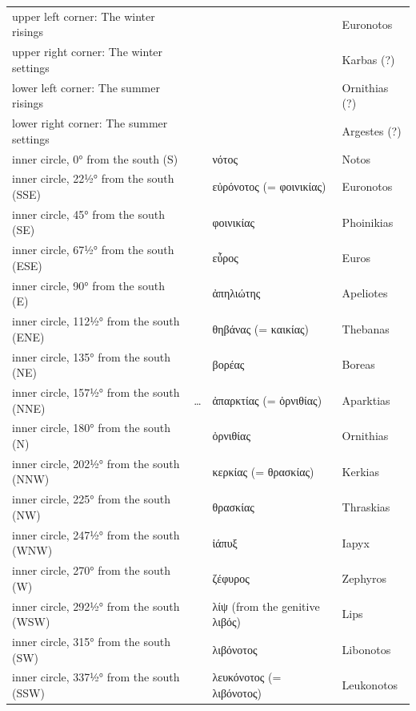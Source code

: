 \begin{landscape}
{\begin{longtable}{L{62mm}L{30mm}L{60mm}L{35mm}}
upper left corner: The winter risings &  &  & Euronotos\\
upper right corner: The winter settings &  &  & Karbas (?)\\
lower left corner: The summer risings &  &  & Ornithias (?)\\
lower right corner: The summer settings &  &  & Argestes (?)\\
inner circle, 0° from the south (S) &  &  νότος & Notos\\
inner circle, 22½° from the south (SSE) &  &  εὐρόνοτος (= φοινικίας) & Euronotos\\
inner circle, 45° from the south (SE) &  &  φοινικίας & Phoinikias\\
inner circle, 67½° from the south (ESE) &  &  εὖρος & Euros\\
inner circle, 90° from the south (E) &  &  ἀπηλιώτης & Apeliotes\\
inner circle, 112½° from the south (ENE) &  &  θηβάνας (= καικίας) & Thebanas\\
inner circle, 135° from the south (NE) &  &  βορέας & Boreas\\
inner circle, 157½° from the south (NNE) & … &  ἀπαρκτίας (= ὀρνιθίας) & Aparktias\\
inner circle, 180° from the south (N) &  &  ὀρνιθίας & Ornithias\\
inner circle, 202½° from the south (NNW) &  &  κερκίας (= θρασκίας) & Kerkias\\
inner circle, 225° from the south (NW) &  &  θρασκίας & Thraskias\\
inner circle, 247½° from the south (WNW) &  &  ἰάπυξ & Iapyx\\
inner circle, 270° from the south (W) &  &  ζέφυρος & Zephyros\\
inner circle, 292½° from the south (WSW) &  &  λίψ (from the genitive λιβός) & Lips\\
inner circle, 315° from the south (SW) &  &  λιβόνοτος & Libonotos\\
inner circle, 337½° from the south (SSW) &  &  λευκόνοτος (= λιβόνοτος) & Leukonotos\\
\end{longtable}}
\clearpage\par{}\bigskip{}\nobreak\medskip


\end{landscape}
